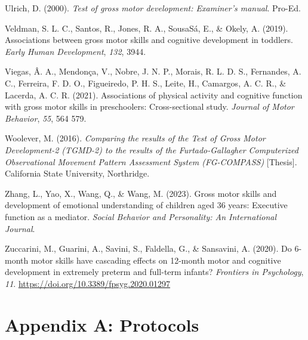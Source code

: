 \documentclass[
  letterpaper,
  DIV=11,
  numbers=noendperiod]{scrreprt}
\newlength{\cslhangindent}
\newenvironment{CSLReferences}[2] %
 {\begin{list}{}{%
  \setlength{\itemindent}{0pt}
  \setlength{\leftmargin}{0pt}
  \setlength{\parsep}{0pt}
  \ifodd #1
   \setlength{\leftmargin}{\cslhangindent}
   \setlength{\itemindent}{-1\cslhangindent}
  \fi
  \setlength{\itemsep}{#2\baselineskip}}}
 {\end{list}}
\begin{document}
\begin{CSLReferences}{1}{0}
Ulrich, D. (2000). \emph{Test of gross motor development: {Examiner}'s
manual}. Pro-Ed.

Veldman, S. L. C., Santos, R., Jones, R. A., SousaSá, E., \& Okely, A.
(2019). Associations between gross motor skills and cognitive
development in toddlers. \emph{Early Human Development}, \emph{132},
3944.

Viegas, Â. A., Mendonça, V., Nobre, J. N. P., Morais, R. L. D. S.,
Fernandes, A. C., Ferreira, F. D. O., Figueiredo, P. H. S., Leite, H.,
Camargos, A. C. R., \& Lacerda, A. C. R. (2021). Associations of
physical activity and cognitive function with gross motor skills in
preschoolers: Cross-sectional study. \emph{Journal of Motor Behavior},
\emph{55}, 564 579.

Woolever, M. (2016). \emph{Comparing the results of the {Test} of {Gross
Motor Development-2} ({TGMD-2}) to the results of the {Furtado-Gallagher
Computerized Observational Movement Pattern Assessment System}
({FG-COMPASS})} {[}Thesis{]}. California State University, Northridge.

Zhang, L., Yao, X., Wang, Q., \& Wang, M. (2023). Gross motor skills and
development of emotional understanding of children aged 3{\textendash}6
years: Executive function as a mediator. \emph{Social Behavior and
Personality: An International Journal}.

Zuccarini, M., Guarini, A., Savini, S., Faldella, G., \& Sansavini, A.
(2020). Do 6-month motor skills have cascading effects on 12-month motor
and cognitive development in extremely preterm and full-term infants?
\emph{Frontiers in Psychology}, \emph{11}.
\url{https://doi.org/10.3389/fpsyg.2020.01297}

\end{CSLReferences}

\cleardoublepage
{}
{}
\appendix

\chapter{Appendix A: Protocols}\label{appendix-a-protocols}


\end{document}
